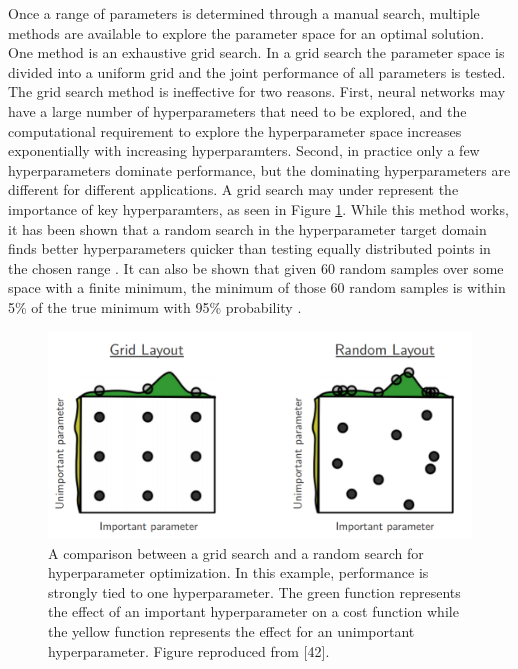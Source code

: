 Once a range of parameters is determined through a manual search, multiple methods are available to explore the parameter space for an optimal solution. One method is an exhaustive grid search. In a grid search the parameter space is divided into a uniform grid and the joint performance of all parameters is tested. The grid search method is ineffective for two reasons. First, neural networks may have a large number of hyperparameters that need to be explored, and the computational requirement to explore the hyperparameter space increases exponentially with increasing hyperparamters. Second, in practice only a few hyperparameters dominate performance, but the dominating hyperparameters are different for different applications. A grid search may under represent the importance of key hyperparamters, as seen in Figure \ref{fig:Bergstra12a_hyperparameter_grid_vs_random}.  While this method works, it has been shown that a random search in the hyperparameter target domain finds better hyperparameters quicker than testing equally distributed points in the chosen range \cite{Bergstra2012}. It can also be shown that given 60 random samples over some space with a finite minimum, the minimum of those 60 random samples is within 5\% of the true minimum with 95\% probability \cite{Zheng2015}.%

\begin{figure}[H]
	\centering
	\includegraphics[width=0.99\linewidth]{images/Bergstra12a_hyperparameter_grid_vs_random}
	\caption{A comparison between a grid search and a random search for hyperparameter optimization. In this example, performance is strongly tied to one hyperparameter. The green function represents the effect of an important hyperparameter on a cost function while the yellow function represents the effect for an unimportant hyperparameter. Figure reproduced from [42].}
	\label{fig:Bergstra12a_hyperparameter_grid_vs_random}
\end{figure}


